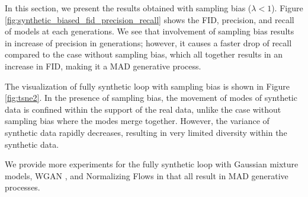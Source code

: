 \documentclass{article}
\def\bias{{\lambda}}
\def\colorSynthetic{colorA}
\def\synthetic{\textcolor{\colorSynthetic}{fully synthetic loop}}
\begin{document}
In this section, we present the results obtained with sampling bias ($\bias < 1$). Figure \ref{fig:synthetic_biased_fid_precision_recall} shows the FID, precision, and recall of models at each generations. We see that involvement of sampling bias results in increase of precision in generations; however, it causes a faster drop of recall compared to the case without sampling bias, which all together results in an increase in FID, making it a MAD generative process.

The visualization of \synthetic{}  with sampling bias is shown in Figure \ref{fig:tsne2}. In the presence of sampling bias, the movement of modes of synthetic data is confined within the support of the real data, unlike the case without sampling bias where the modes merge together. However, the variance of synthetic data rapidly decreases, resulting in very limited diversity within the synthetic data. 

We provide more experiments for the \synthetic{} with Gaussian mixture models, WGAN \cite{wgan_gp}, and Normalizing Flows \cite{normalizing_flow} in  that all result in MAD generative processes.
\end{document}
